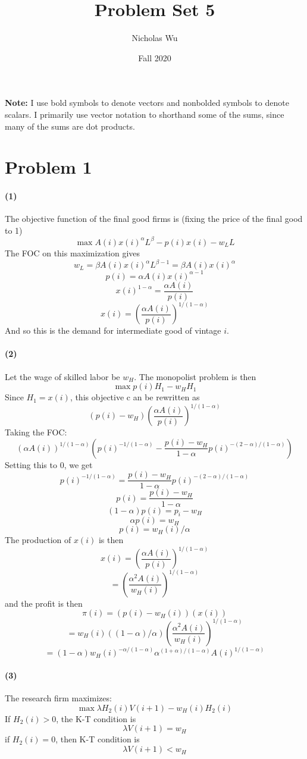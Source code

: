 \documentclass[10pt,letter]{article}
\newcommand{\problem}[1]{\section*{Problem #1}}
\newcommand{\problempart}[1]{\paragraph{#1}}
\begin{document}


\title{Problem Set 5}

\author{Nicholas Wu}

\date{Fall 2020}

\maketitle
\textbf{Note:} I use bold symbols to denote vectors and nonbolded symbols to denote scalars. I primarily use vector notation to shorthand some of the sums, since many of the sums are dot products.

\problem{1}
\problempart{(1)}
The objective function of the final good firms is (fixing the price of the final good to 1)
\[ \max A(i) x(i)^\alpha L^\beta - p(i) x(i) - w_L L \]
The FOC on this maximization gives
\[ w_L = \beta A(i) x(i)^\alpha L^{\beta - 1} =  \beta A(i) x(i)^\alpha \]
\[ p(i) = \alpha A(i) x(i)^{\alpha - 1} \]
\[ x(i)^{1- \alpha} = \frac{\alpha A(i)}{p(i)} \]
\[ x(i) = \left(\frac{\alpha A(i)}{p(i)}\right)^{1/(1-\alpha)} \]
And so this is the demand for intermediate good of vintage $i$.
\problempart{(2)}
Let the wage of skilled labor be $w_H$. The monopolist problem is then
\[ \max p(i) H_1 - w_H H_1 \]
Since $H_1 = x(i)$, this objective c an be rewritten as
\[ (p(i) - w_H) \left(\frac{\alpha A(i)}{p(i)}\right)^{1/(1-\alpha)}  \]
Taking the FOC:
\[ (\alpha A(i))^{1/(1-\alpha)}\left(p(i)^{-1/(1-\alpha)} - \frac{p(i) - w_H}{1-\alpha} p(i)^{-(2-\alpha)/(1-\alpha)}\right)  \]
Setting this to 0, we get
\[ p(i)^{-1/(1-\alpha)} = \frac{p(i) - w_H}{1-\alpha} p(i)^{-(2-\alpha)/(1-\alpha)} \]
\[ p(i) = \frac{p(i) - w_H}{1-\alpha} \]
\[ (1-\alpha)p(i) = p_i - w_H \]
\[ \alpha p(i) = w_H \]
\[ p(i) = w_H(i) / \alpha \]
The production of $x(i)$ is then
\[ x(i) = \left(\frac{\alpha A(i)}{p(i)}\right)^{1/(1-\alpha)} \]
\[ = \left(\frac{\alpha^2 A(i)}{w_H(i)}\right)^{1/(1-\alpha)} \]
and the profit is then
\[ \pi(i) = (p(i) - w_H(i))(x(i)) \]
\[ = w_H(i)((1-\alpha)/\alpha)\left(\frac{\alpha^2 A(i)}{w_H(i)}\right)^{1/(1-\alpha)} \]
\[ = (1-\alpha) w_H(i)^{-\alpha/(1-\alpha)}\alpha^{(1+\alpha)/(1-\alpha)}A(i)^{1/(1-\alpha)} \]
\problempart{(3)}
The research firm maximizes:
\[ \max \lambda H_2(i) V(i+1) - w_H(i) H_2(i) \]
If $H_2(i) > 0$, the K-T condition is
\[ \lambda V(i+1) = w_H \]
if $H_2(i) = 0$, then K-T condition is
\[ \lambda V(i+1) < w_H \]
\end{document}
